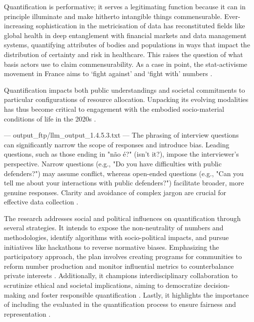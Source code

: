 Quantification is performative; it serves a legitimating function because it can in principle illuminate and make hitherto intangible things commensurable. Ever-increasing sophistication in the metricisation of data has reconstituted fields like global health in deep entanglement with financial markets and data management systems, quantifying attributes of bodies and populations in ways that impact the distribution of certainty and risk in healthcare. This raises the question of what basis actors use to claim commensurability. As a case in point, the stat-activisme movement in France aims to ‘fight against’ and ‘fight with’ numbers \cite{10_1057_s41599_020_0396_5}.

Quantification impacts both public understandings and societal commitments to particular configurations of resource allocation. Unpacking its evolving modalities has thus become critical to engagement with the embodied socio-material conditions of life in the 2020s \cite{10_1057_s41599_020_0396_5}.


---
output_ftp/llm_output_1.4.5.3.txt
---
The phrasing of interview questions can significantly narrow the scope of responses and introduce bias. Leading questions, such as those ending in "não é?" (isn't it?), impose the interviewer’s perspective. Narrow questions (e.g., "Do you have difficulties with public defenders?") may assume conflict, whereas open-ended questions (e.g., "Can you tell me about your interactions with public defenders?") facilitate broader, more genuine responses. Clarity and avoidance of complex jargon are crucial for effective data collection \cite{machado2017}.

The research addresses social and political influences on quantification through several strategies. It intends to expose the non-neutrality of numbers and methodologies, identify algorithms with socio-political impacts, and pursue initiatives like hackathons to reverse normative biases. Emphasizing the participatory approach, the plan involves creating programs for communities to reform number production and monitor influential metrics to counterbalance private interests \cite{di2023}. Additionally, it champions interdisciplinary collaboration to scrutinize ethical and societal implications, aiming to democratize decision-making and foster responsible quantification \cite{sareen2020}. Lastly, it highlights the importance of including the evaluated in the quantification process to ensure fairness and representation \cite{salais2016}.

